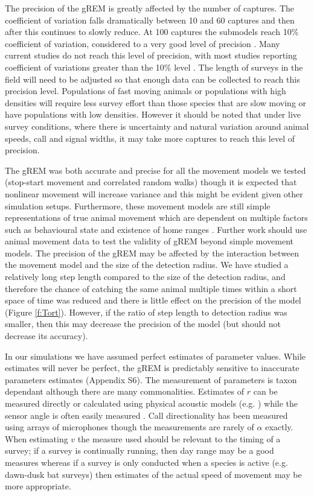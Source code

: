 \documentclass[a4paper,10pt,reqno,oneside]{amsart}
\begin{document}
The precision of the gREM is greatly affected by the number of captures. The coefficient of variation falls dramatically between 10 and 60 captures and then after this continues to slowly reduce. At 100 captures the submodels reach 10\% coefficient of variation, considered to a very good level of precision \citep{thomas2012passive}. Many current studies do not reach this level of precision, with most studies reporting coefficient of variations greater than the 10\% level \citep{o2003crouching, proctor2010ecological, foster2012critique}. The length of surveys in the field will need to be adjusted so that enough data can be collected to reach this precision level. Populations of fast moving animals or populations with high densities will require less survey effort than those species that are slow moving or have populations with low densities. However it should be noted that under live survey conditions, where there is uncertainty and natural variation around animal speeds, call and signal widths, it may take more captures to reach this level of precision.  

The gREM was both accurate and precise for all the movement models we tested (stop-start movement and correlated random walks) though it is expected that nonlinear movement will increase variance \citep{Hutchinson_Waser_2007} and this might be evident given other simulation setups. Furthermore, these movement models are still simple representations of true animal movement which are dependent on multiple factors such as behavioural state and existence of home ranges \citep{smouse2010stochastic}. Further work should use animal movement data to test the validity of gREM beyond simple movement models. The precision of the gREM may be affected by the interaction between the movement model and the size of the detection radius. We have studied a relatively long step length compared to the size of the detection radius, and therefore the chance of catching the same animal multiple times within a short space of time was reduced and there is little effect on the precision of the model (Figure \ref{f:Tort}). However, if the ratio of step length to detection radius was smaller, then this may decrease the precision of the model (but should not decrease its accuracy). 

In our simulations we have assumed perfect estimates of parameter values. While estimates will never be perfect, the gREM is predictably sensitive to inaccurate parameters estimates (Appendix S6). The measurement of parameters is taxon dependant although there are many commonalities. Estimates of $r$ can be measured directly or calculated using physical acoustic models (e.g. \citep{holderied2003echolocation}) while the sensor angle is often easily measured \citep{adams2012you}. Call directionality has been measured using arrays of microphones \citep{brinklov2011} though the measurements are rarely of $\alpha$ exactly. When estimating $v$ the measure used should be relevant to the timing of a survey; if a survey is continually running, then day range may be a good measures \citep{carbone2005far} whereas if a survey is only conducted when a species is active (e.g. dawn-dusk bat surveys) then estimates of the actual speed of movement may be more appropriate. 
\end{document}
